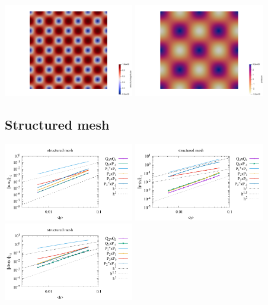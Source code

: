 \begin{center}
\includegraphics[width=5.7cm]{python_codes/fieldstone_120/paperresults/tesk12/vel}
\includegraphics[width=5.7cm]{python_codes/fieldstone_120/paperresults/tesk12/press}
\end{center}

\subsection*{Structured mesh}

\begin{center}
\includegraphics[width=5.7cm]{python_codes/fieldstone_120/paperresults/tesk12_structured_errorsV.pdf}
\includegraphics[width=5.7cm]{python_codes/fieldstone_120/paperresults/tesk12_structured_errorsP.pdf}
\includegraphics[width=5.7cm]{python_codes/fieldstone_120/paperresults/tesk12_structured_errors_divv.pdf}\\
\end{center}


